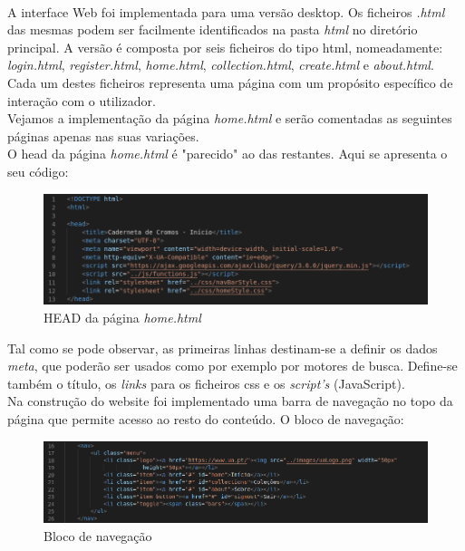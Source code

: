 \documentclass[a4paper, 11pt, oneside]{report}
\begin{document}
\paragraph{} A interface Web foi implementada para uma versão desktop. Os ficheiros \textit{\*.html} das mesmas podem ser facilmente identificados na pasta \textit{html} no diretório principal. A versão é composta por seis ficheiros do tipo \ac{html}, nomeadamente: \textit{login.html}, \textit{register.html}, \textit{home.html}, \textit{collection.html}, \textit{create.html} e \textit{about.html}. Cada um destes ficheiros representa uma página com um propósito específico de interação com o utilizador.\\
\indent Vejamos a implementação da página \textit{home.html} e serão comentadas as seguintes páginas apenas nas suas variações. \\
\indent O head da página \textit{home.html} é "parecido" ao das restantes. Aqui se apresenta o seu código:

\begin{figure}[h]
\center
\includegraphics[width=350pt]{headHOME.png}
\caption{HEAD da página \textit{home.html}}
\label{fig:head}
\end{figure}

\indent Tal como se pode observar, as primeiras linhas destinam-se a definir os dados \textit{meta}, que poderão ser usados como por exemplo por motores de busca. Define-se também o título, os \textit{links} para os ficheiros \ac{css} e os \textit{script's} (JavaScript).\\
\indent Na construção do website foi implementado uma barra de navegação no topo
da página que permite acesso ao resto do conteúdo. O bloco de navegação:

\begin{figure}[h]
\center
\includegraphics[width=350pt]{navBLOCO.png}
\caption{Bloco de navegação}
\end{figure}
\end{document}
